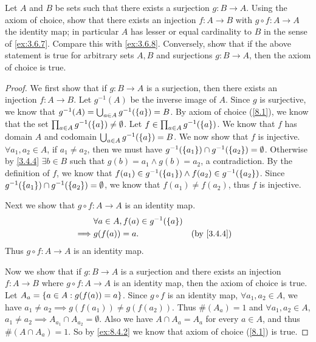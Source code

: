 \begin{ex}\label{ex:8.4.3}
  Let \(A\) and \(B\) be sets such that there exists a surjection \(g : B \to A\).
  Using the axiom of choice, show that there exists an injection \(f: A \to B\) with \(g \circ f : A \to A\) the identity map;
  in particular \(A\) has lesser or equal cardinality to \(B\) in the sense of \cref{ex:3.6.7}.
  Compare this with \cref{ex:3.6.8}.
  Conversely, show that if the above statement is true for arbitrary sets \(A, B\) and surjections \(g : B \to A\), then the axiom of choice is true.
\end{ex}

\begin{proof}
  We first show that if \(g : B \to A\) is a surjection, then there exists an injection \(f : A \to B\).
  Let \(g^{-1}(A)\) be the inverse image of \(A\).
  Since \(g\) is surjective, we know that \(g^{-1}(A) = \bigcup_{a \in A} g^{-1}(\left\lbrace a\right\rbrace) = B\).
  By axiom of choice (\cref{8.1}), we know that the set \(\prod_{a \in A} g^{-1}(\left\lbrace a\right\rbrace) \neq \emptyset\).
  Let \(f \in \prod_{a \in A} g^{-1}(\left\lbrace a\right\rbrace)\).
  We know that \(f\) has domain \(A\) and codomain \(\bigcup_{a \in A} g^{-1}(\left\lbrace a\right\rbrace) = B\).
  We now show that \(f\) is injective.
  \(\forall a_1, a_2 \in A\), if \(a_1 \neq a_2\), then we must have \(g^{-1}(\left\lbrace a_1\right\rbrace) \cap g^{-1}(\left\lbrace a_2\right\rbrace) = \emptyset\).
  Otherwise by \cref{3.4.4} \(\exists b \in B\) such that \(g(b) = a_1 \land g(b) = a_2\), a contradiction.
  By the definition of \(f\), we know that \(f(a_1) \in g^{-1}(\left\lbrace a_1\right\rbrace) \land f(a_2) \in g^{-1}(\left\lbrace a_2\right\rbrace)\).
  Since \(g^{-1}(\left\lbrace a_1\right\rbrace) \cap g^{-1}(\left\lbrace a_2\right\rbrace) = \emptyset\), we know that \(f(a_1) \neq f(a_2)\), thus \(f\) is injective.

  Next we show that \(g \circ f : A \to A\) is an identity map.
  \begin{align*}
             & \forall a \in A, f(a) \in g^{-1}(\set{a})                 \\
    \implies & g(f(a)) = a.                              &  & \by{3.4.4}
  \end{align*}
  Thus \(g \circ f : A \to A\) is an identity map.

  Now we show that if \(g : B \to A\) is a surjection and there exists an injection \(f : A \to B\) where \(g \circ f : A \to A\) is an identity map, then the axiom of choice is true.
  Let \(A_a = \left\lbrace a \in A : g(f(a)) = a\right\rbrace\).
  Since \(g \circ f\) is an identity map, \(\forall a_1, a_2 \in A\), we have \(a_1 \neq a_2 \implies g(f(a_1)) \neq g(f(a_2))\).
  Thus \(\#(A_a) = 1\) and \(\forall a_1, a_2 \in A\), \(a_1 \neq a_2 \implies A_{a_1} \cap A_{a_2} = \emptyset\).
  Also we have \(A \cap A_a = A_a\) for every \(a \in A\), and thus \(\#(A \cap A_a) = 1\).
  So by \cref{ex:8.4.2} we know that axiom of choice (\cref{8.1}) is true.
\end{proof}
